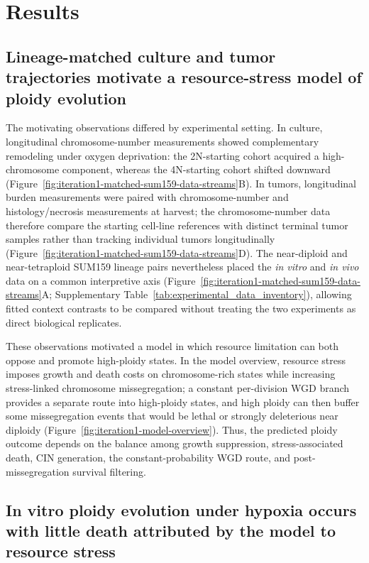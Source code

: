 \documentclass[11pt]{article}
\begin{document}
\section*{Results}



\subsection*{Lineage-matched culture and tumor trajectories motivate a resource-stress model of ploidy evolution}

The motivating observations differed by experimental setting. In culture, longitudinal chromosome-number measurements showed complementary remodeling under oxygen deprivation: the 2N-starting cohort acquired a high-chromosome component, whereas the 4N-starting cohort shifted downward (Figure~\ref{fig:iteration1-matched-sum159-data-streams}B). In tumors, longitudinal burden measurements were paired with chromosome-number and histology/necrosis measurements at harvest; the chromosome-number data therefore compare the starting cell-line references with distinct terminal tumor samples rather than tracking individual tumors longitudinally (Figure~\ref{fig:iteration1-matched-sum159-data-streams}D). The near-diploid and near-tetraploid SUM159 lineage pairs nevertheless placed the \textit{in vitro} and \textit{in vivo} data on a common interpretive axis (Figure~\ref{fig:iteration1-matched-sum159-data-streams}A; Supplementary Table~\ref{tab:experimental_data_inventory}), allowing fitted context contrasts to be compared without treating the two experiments as direct biological replicates.

These observations motivated a model in which resource limitation can both oppose and promote high-ploidy states. In the model overview, resource stress imposes growth and death costs on chromosome-rich states while increasing stress-linked chromosome missegregation; a constant per-division WGD branch provides a separate route into high-ploidy states, and high ploidy can then buffer some missegregation events that would be lethal or strongly deleterious near diploidy (Figure~\ref{fig:iteration1-model-overview}). Thus, the predicted ploidy outcome depends on the balance among growth suppression, stress-associated death, CIN generation, the constant-probability WGD route, and post-missegregation survival filtering.


\subsection*{In vitro ploidy evolution under hypoxia occurs with little death attributed by the model to resource stress}
\end{document}
